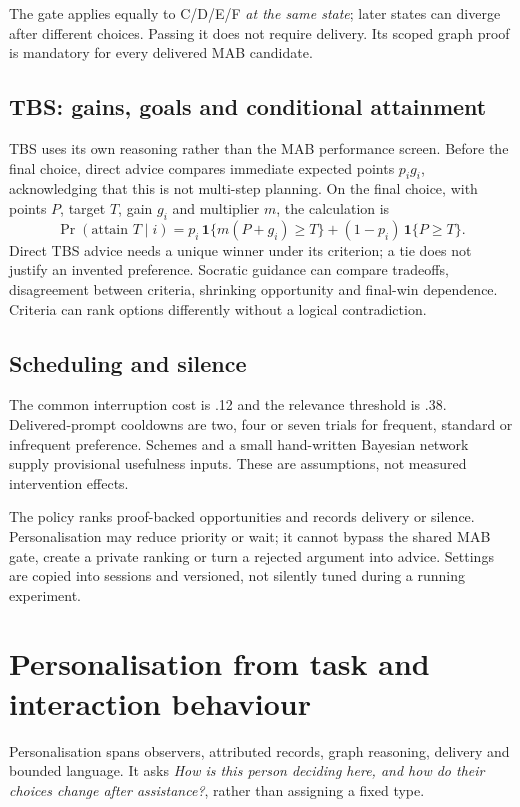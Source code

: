 \documentclass[11pt,a4paper]{article}
\begin{document}
The gate applies equally to C/D/E/F \emph{at the same state}; later states can diverge after different choices. Passing it does not require delivery. Its scoped graph proof is mandatory for every delivered MAB candidate.

\subsection{TBS: gains, goals and conditional attainment}
TBS uses its own reasoning rather than the MAB performance screen. Before the final choice, direct advice compares immediate expected points $p_i g_i$, acknowledging that this is not multi-step planning. On the final choice, with points $P$, target $T$, gain $g_i$ and multiplier $m$, the calculation is
\[
 \Pr(\text{attain }T\mid i)
 =p_i\,\mathbf{1}\{m(P+g_i)\geq T\}
 +(1-p_i)\,\mathbf{1}\{P\geq T\}.
\]
Direct TBS advice needs a unique winner under its criterion; a tie does not justify an invented preference. Socratic guidance can compare tradeoffs, disagreement between criteria, shrinking opportunity and final-win dependence. Criteria can rank options differently without a logical contradiction.

\subsection{Scheduling and silence}
The common interruption cost is .12 and the relevance threshold is .38. Delivered-prompt cooldowns are two, four or seven trials for frequent, standard or infrequent preference. Schemes and a small hand-written Bayesian network supply provisional usefulness inputs. These are assumptions, not measured intervention effects.

The policy ranks proof-backed opportunities and records delivery or silence. Personalisation may reduce priority or wait; it cannot bypass the shared MAB gate, create a private ranking or turn a rejected argument into advice. Settings are copied into sessions and versioned, not silently tuned during a running experiment.

\section{Personalisation from task and interaction behaviour}
Personalisation spans observers, attributed records, graph reasoning, delivery and bounded language. It asks \emph{How is this person deciding here, and how do their choices change after assistance?}, rather than assigning a fixed type.
\end{document}
